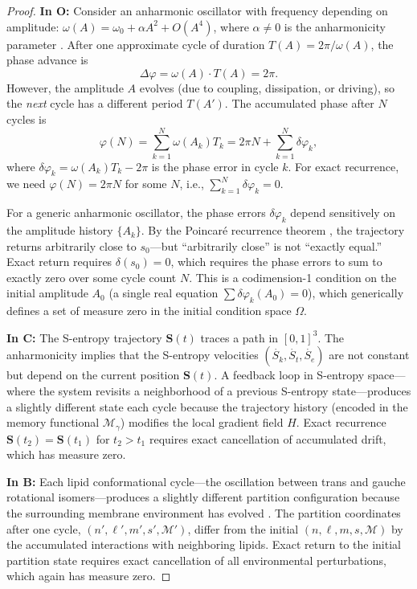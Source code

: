 \documentclass[twocolumn,10pt]{article}
\theoremstyle{remark}
\newcommand{\Depth}{\mathcal{M}}
\newcommand{\Sk}{S_k}
\newcommand{\St}{S_t}
\newcommand{\Se}{S_e}
\newcommand{\Scoord}{\mathbf{S}}
\newcommand{\CatO}{\mathbf{O}}
\newcommand{\CatC}{\mathbf{C}}
\newcommand{\CatB}{\mathbf{B}}
\begin{document}
\begin{proof}
\textbf{In $\CatO$:}
Consider an anharmonic oscillator with frequency depending on amplitude: $\omega(A) = \omega_0 + \alpha A^2 + O(A^4)$, where $\alpha \neq 0$ is the anharmonicity parameter \cite{strogatz2015}.
After one approximate cycle of duration $T(A) = 2\pi/\omega(A)$, the phase advance is
\begin{equation}
\Delta\varphi = \omega(A) \cdot T(A) = 2\pi.
\end{equation}
However, the amplitude $A$ evolves (due to coupling, dissipation, or driving), so the \emph{next} cycle has a different period $T(A')$.
The accumulated phase after $N$ cycles is
\begin{equation}
\varphi(N) = \sum_{k=1}^{N} \omega(A_k) T_k = 2\pi N + \sum_{k=1}^{N}\delta\varphi_k,
\end{equation}
where $\delta\varphi_k = \omega(A_k)T_k - 2\pi$ is the phase error in cycle $k$.
For exact recurrence, we need $\varphi(N) = 2\pi N$ for some $N$, i.e., $\sum_{k=1}^N \delta\varphi_k = 0$.

For a generic anharmonic oscillator, the phase errors $\delta\varphi_k$ depend sensitively on the amplitude history $\{A_k\}$.
By the Poincar\'{e} recurrence theorem \cite{poincare1890}, the trajectory returns arbitrarily close to $s_0$---but ``arbitrarily close'' is not ``exactly equal.''
Exact return requires $\delta(s_0) = 0$, which requires the phase errors to sum to exactly zero over some cycle count $N$.
This is a codimension-1 condition on the initial amplitude $A_0$ (a single real equation $\sum \delta\varphi_k(A_0) = 0$), which generically defines a set of measure zero in the initial condition space $\Omega$.

\textbf{In $\CatC$:}
The S-entropy trajectory $\Scoord(t)$ traces a path in $[0,1]^3$.
The anharmonicity implies that the S-entropy velocities $(\dot{\Sk}, \dot{\St}, \dot{\Se})$ are not constant but depend on the current position $\Scoord(t)$.
A feedback loop in S-entropy space---where the system revisits a neighborhood of a previous S-entropy state---produces a slightly different state each cycle because the trajectory history (encoded in the memory functional $\mathcal{M}_\gamma$) modifies the local gradient field $H$.
Exact recurrence $\Scoord(t_2) = \Scoord(t_1)$ for $t_2 > t_1$ requires exact cancellation of accumulated drift, which has measure zero.

\textbf{In $\CatB$:}
Each lipid conformational cycle---the oscillation between trans and gauche rotational isomers---produces a slightly different partition configuration because the surrounding membrane environment has evolved \cite{gennis1989,lipowsky1995}.
The partition coordinates after one cycle, $(n', \ell', m', s', \Depth')$, differ from the initial $(n, \ell, m, s, \Depth)$ by the accumulated interactions with neighboring lipids.
Exact return to the initial partition state requires exact cancellation of all environmental perturbations, which again has measure zero.


\end{proof}
\end{document}

